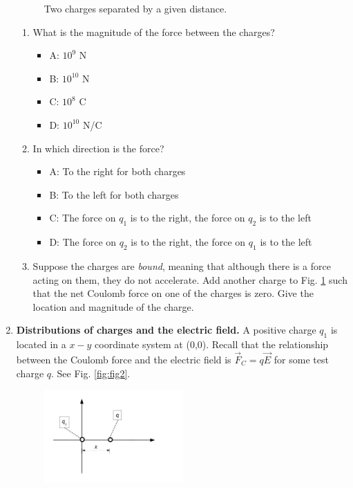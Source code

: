 \documentclass[10pt]{article}
\begin{document}
\begin{enumerate}
\begin{figure}[hb]
\caption{\label{fig:fig1} Two charges separated by a given distance.}
\end{figure}
\begin{enumerate}
\item What is the magnitude of the force between the charges?
\begin{itemize}
\item A: $10^9$ N
\item B: $10^{10}$ N
\item C: $10^8$ C
\item D: $10^{10}$ N/C
\end{itemize}
\item In which direction is the force?
\begin{itemize}
\item A: To the right for both charges
\item B: To the left for both charges
\item C: The force on $q_1$ is to the right, the force on $q_2$ is to the left
\item D: The force on $q_2$ is to the right, the force on $q_1$ is to the left
\end{itemize}
\item Suppose the charges are \textit{bound}, meaning that although there is a force acting on them, they do not accelerate.  Add another charge to Fig. \ref{fig:fig1} such that the net Coulomb force on one of the charges is zero.  Give the location and magnitude of the charge. \\ \vspace{2cm}
\end{enumerate}
\item \textbf{Distributions of charges and the electric field.} A positive charge $q_1$ is located in a $x-y$ coordinate system at (0,0).  Recall that the relationship between the Coulomb force and the electric field is $\vec{F}_C = q\vec{E}$ for some test charge $q$.  See Fig. \ref{fig:fig2}.
\begin{figure}[hb]
\centering
\includegraphics[width=0.5\textwidth]{midtermDiagram2.pdf}

\end{figure}
\end{enumerate}
\end{document}
